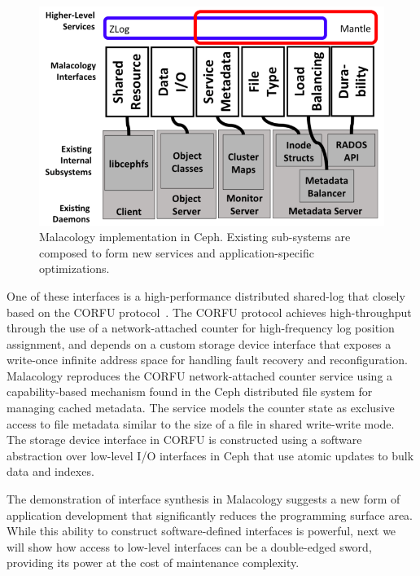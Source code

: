 \begin{figure}[t]
\centering
\includegraphics[width=1.0\linewidth]{implementation-overview.png}
\caption{Malacology implementation in Ceph. Existing sub-systems are composed
    to form new services and application-specific optimizations.}
\label{fig:malacology}
\end{figure}

One of these interfaces is a high-performance distributed shared-log that
closely based on the CORFU protocol~\cite{balakrishnan:nsdi12}. The CORFU
protocol achieves high-throughput through the use of a network-attached
counter for high-frequency log position assignment, and depends on a custom
storage device interface that exposes a write-once infinite address space for
handling fault recovery and reconfiguration. Malacology reproduces the CORFU
network-attached counter service using a capability-based mechanism found in
the Ceph distributed file system for managing cached metadata. The service
models the counter state as exclusive access to file metadata similar to the
size of a file in shared write-write mode. The storage device interface in
CORFU is constructed using a software abstraction over low-level I/O
interfaces in Ceph that use atomic updates to bulk data and indexes.

The demonstration of interface synthesis in Malacology suggests a new form of
application development that significantly reduces the programming surface
area. While this ability to construct software-defined interfaces is powerful,
next we will show how access to low-level interfaces can be a double-edged
sword, providing its power at the cost of maintenance complexity.
